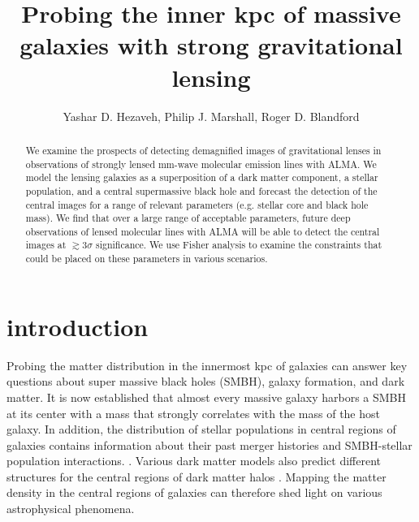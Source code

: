 \documentclass[chicago]{emulateapj}
\begin{document}
\title{Probing the inner kpc of massive galaxies with strong gravitational lensing}
\author{Yashar D. Hezaveh, Philip J. Marshall, Roger D. Blandford}  

\begin{abstract}  
\noindent
We examine the prospects of detecting demagnified images of gravitational lenses in observations of strongly lensed mm-wave molecular emission lines with ALMA. We model the lensing galaxies as a superposition of a dark matter component, a stellar population, and a central supermassive black hole and forecast the detection of the central images for a range of relevant parameters (e.g. stellar core and black hole mass).
We find that over a large range of acceptable parameters, future deep observations of lensed molecular lines with ALMA will be able to detect the central images at $\gtrsim 3\sigma$ significance. We use Fisher analysis to examine the  constraints that could be placed on these parameters in various scenarios. 

\end{abstract}






\section{introduction}
Probing the matter distribution in the innermost kpc of galaxies can answer key questions about super massive black holes (SMBH), galaxy formation, and dark matter. It is now established that almost every massive galaxy harbors a SMBH at its center \citep[][]{} with a mass that strongly correlates with the mass of the host galaxy.
In addition, the distribution of stellar populations in central regions of galaxies contains information about their past merger histories and SMBH-stellar population interactions. \citep{}.  Various dark matter models also predict different structures for the central regions of dark matter halos \citep[e.g][]{rochaetal}.  Mapping the matter density in the central regions of galaxies can therefore shed light on various astrophysical phenomena.
\end{document}
